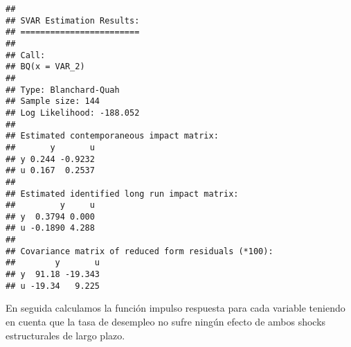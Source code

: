 \documentclass[
]{book}
\begin{document}
\begin{verbatim}
## 
## SVAR Estimation Results:
## ======================== 
## 
## Call:
## BQ(x = VAR_2)
## 
## Type: Blanchard-Quah 
## Sample size: 144 
## Log Likelihood: -188.052 
## 
## Estimated contemporaneous impact matrix:
##       y       u
## y 0.244 -0.9232
## u 0.167  0.2537
## 
## Estimated identified long run impact matrix:
##         y     u
## y  0.3794 0.000
## u -0.1890 4.288
## 
## Covariance matrix of reduced form residuals (*100):
##        y       u
## y  91.18 -19.343
## u -19.34   9.225
\end{verbatim}

En seguida calculamos la función impulso respuesta para cada variable teniendo en cuenta que la tasa de desempleo no sufre ningún efecto de ambos shocks estructurales de largo plazo.
\end{document}
